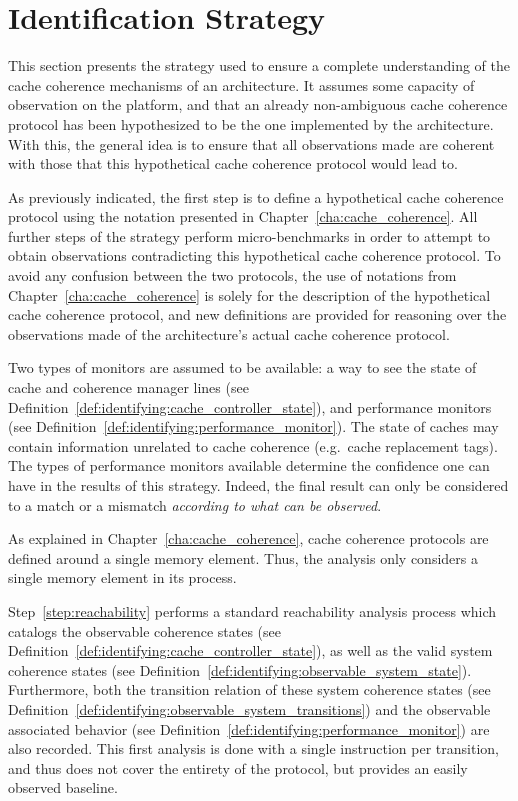 \section{Identification Strategy}
\label{sec:identification:strategy}
This section presents the strategy used to ensure a complete understanding of
the cache coherence mechanisms of an architecture. It assumes some capacity of
observation on the platform, and that an already non-ambiguous cache coherence
protocol has been hypothesized to be the one implemented by the architecture.
With this, the general idea is to ensure that all observations made are
coherent with those that this hypothetical cache coherence protocol would lead
to.

As previously indicated, the first step is to define a hypothetical cache
coherence protocol using the notation presented in
Chapter~\ref{cha:cache_coherence}. All further steps of the strategy perform
micro-benchmarks in order to attempt to obtain observations contradicting this
hypothetical cache coherence protocol. To avoid any confusion between the two
protocols, the use of notations from Chapter~\ref{cha:cache_coherence} is solely
for the description of the hypothetical cache coherence protocol, and new
definitions are provided for reasoning over the observations made of the
architecture's actual cache coherence protocol.

Two types of monitors are assumed to be available: a way to see the state of
cache and coherence manager lines (see
Definition~\ref{def:identifying:cache_controller_state}), and performance
monitors (see Definition~\ref{def:identifying:performance_monitor}). The state
of caches may contain information unrelated to cache coherence (e.g.~cache
replacement tags). The types of performance monitors available determine the
confidence one can have in the results of this strategy. Indeed, the final
result can only be considered to a match or a mismatch \textit{according to what
can be observed}.

As explained in Chapter~\ref{cha:cache_coherence}, cache coherence protocols are
defined around a single memory element. Thus, the analysis only considers a
single memory element in its process.

Step~\ref{step:reachability} performs a standard reachability analysis process
which catalogs the observable coherence states (see
Definition~\ref{def:identifying:cache_controller_state}), as well as the valid
system coherence states (see
Definition~\ref{def:identifying:observable_system_state}). Furthermore, both the
transition relation of these system coherence states (see
Definition~\ref{def:identifying:observable_system_transitions}) and the
observable associated behavior (see
Definition~\ref{def:identifying:performance_monitor}) are also recorded. This
first analysis is done with a single instruction per transition, and thus does
not cover the entirety of the protocol, but provides an easily observed
baseline.

